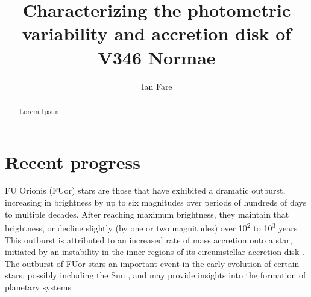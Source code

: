 \documentclass[iop,apj,tighten]{emulateapj}
\begin{document}
\newpage

\title{Characterizing the photometric variability and accretion disk of V346 Normae}
\author{Ian Fare}

\begin{abstract}
Lorem Ipsum
\end{abstract}

\maketitle
\thispagestyle{fancy}

\section{Recent progress}
FU Orionis (FUor) stars are those that have exhibited a dramatic outburst, increasing in brightness by up to six magnitudes over periods of hundreds of days to multiple decades. After reaching maximum brightness, they maintain that brightness, or decline slightly (by one or two magnitudes) over 10\textsuperscript{2} to 10\textsuperscript{3} years \citep{hartmann_fu_1996}. This outburst is attributed to an increased rate of mass accretion onto a star, initiated by an instability in the inner regions of its circumstellar accretion disk \citep{turner_models_1997}. The outburst of FUor stars an important event in the early evolution of certain stars, possibly including the Sun \citep{herbig_eruptive_1977}, and may provide insights into the formation of planetary systems \citep{turner_models_1997}.
\end{document}

